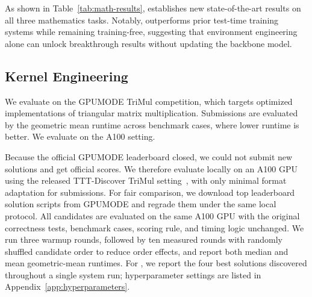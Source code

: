 \documentclass{article} %
\begin{document}
   As shown in Table~\ref{tab:math-results}, \method establishes new state-of-the-art results on all three mathematics tasks.
   Notably, \method outperforms prior test-time training systems while remaining training-free, suggesting that environment engineering alone can unlock breakthrough results
   without updating the backbone model.
   
   
   \subsection{Kernel Engineering}
   
   We evaluate \method on the GPUMODE TriMul competition, which targets optimized implementations of triangular matrix multiplication. 
   Submissions are evaluated by the geometric mean runtime across benchmark cases, where lower runtime is better.
   We evaluate on the A100 setting.
   
   Because the official GPUMODE leaderboard closed,
   we could not submit new solutions and get official scores.
   We therefore evaluate locally on an A100 GPU using the released TTT-Discover TriMul setting~\citep{tttdiscover}, with only minimal format adaptation for \method submissions.
   For fair comparison, we download top leaderboard solution scripts from GPUMODE and regrade them under the same local protocol.
   All candidates are evaluated on the same A100 GPU with the original correctness tests, benchmark cases, scoring rule, and timing logic unchanged.
   We run three warmup rounds, followed by ten measured rounds with randomly shuffled candidate order to reduce order effects, and report both median and mean geometric-mean runtimes.
   For \method, we report the four best solutions discovered throughout a single system run; hyperparameter settings are listed in Appendix~\ref{app:hyperparameters}.
   
\end{document}
